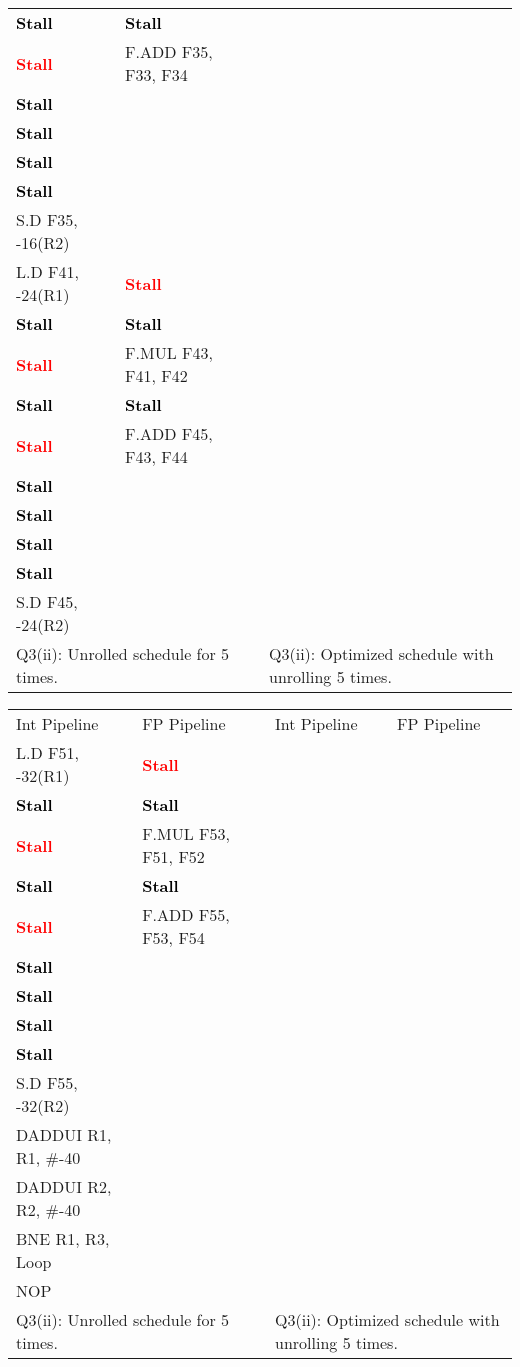 \documentclass[11pt]{article}
\newcommand{\code}[1]{\textsf{#1}}
\newcommand{\stall}{\textcolor{red}{\textbf{Stall}}}
\newcommand{\cellstall}{\cellcolor{red!25}\textcolor{black}{\textbf{Stall}}}
\begin{document}
\begin{table}[h]
\begin{tabular}{llcll}
	 \cellstall & \cellstall & & & \\
	 \stall & \code{F.ADD F35, F33, F34} & & & \\
	 \cellstall &  & & & \\
	 \cellstall &  &  &  & \\
	 \cellstall &  & &  &  \\
	 \cellstall &  & &   &   \\
	 \code{S.D F35, -16(R2)} &  & &  &  \\ 
	 \code{L.D F41, -24(R1)} & \stall & & & \\	
	 \cellstall & \cellstall & & & \\
	 \stall & \code{F.MUL F43, F41, F42} & & & \\
	 \cellstall & \cellstall & & &  \\
	 \stall & \code{F.ADD F45, F43, F44} & & & \\
	 \cellstall &  & & & \\
	 \cellstall &  &  &  & \\
	 \cellstall &  & &  &  \\
	 \cellstall &  & &   &   \\
	 \code{S.D F45, -24(R2)} &  & &  &  \\  
	 \multicolumn{2}{l}{Q3(ii): Unrolled schedule for 5 times.} & & \multicolumn{2}{l}{Q3(ii): Optimized schedule with unrolling 5 times.} 
\end{tabular}
\label{tbl:q3-p1-1}
\end{table}

\begin{table}[h]
\begin{tabular}{llcll}
	 Int Pipeline & FP Pipeline & & Int Pipeline & FP Pipeline \\ 
	 \code{L.D F51, -32(R1)} & \stall & & & \\	
	 \cellstall & \cellstall & & & \\
	 \stall & \code{F.MUL F53, F51, F52} & & & \\
	 \cellstall & \cellstall & & &  \\
	 \stall & \code{F.ADD F55, F53, F54} & & & \\
	 \cellstall &  & & & \\
	 \cellstall &  &  &  & \\
	 \cellstall &  & &  &  \\
	 \cellstall &  & &   &   \\
	 \code{S.D F55, -32(R2)} &  & &  &  \\ 
	 \code{DADDUI R1, R1, \#-40} &  & &  & \\
	 \code{DADDUI R2, R2, \#-40} &  & &  & \\
	 \code{BNE R1, R3, Loop}  &  & &  &  \\
	 \code{NOP} &  & & & \\
	 \multicolumn{2}{l}{Q3(ii): Unrolled schedule for 5 times.} & & \multicolumn{2}{l}{Q3(ii): Optimized schedule with unrolling 5 times.} 
\end{tabular}
\label{tbl:q3-p1-2}
\end{table}
\end{document}
